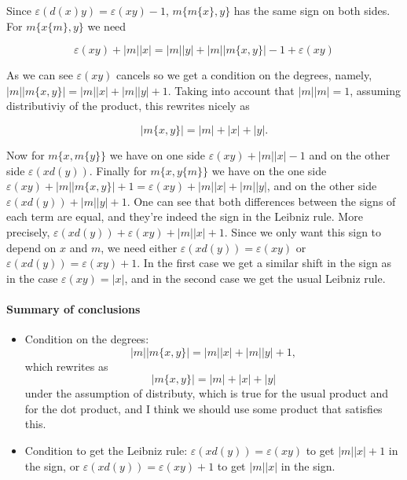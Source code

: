 \documentclass[twoside]{article}
\begin{document}
Since $\varepsilon(d(x)y)=\varepsilon(xy)-1$, $m\{m\{x\},y\}$ has the same sign on both sides. For $m\{x\{m\},y\}$ we need

\[
\varepsilon(xy)+|m||x|=|m||y|+|m||m\{x,y\}|-1+\varepsilon(xy)
\] 

%
%



As we can see $\varepsilon(xy)$ cancels so we get a condition on the degrees, namely, $|m||m\{x,y\}|=|m||x|+|m||y|+1$. Taking into account that $|m||m|=1$, assuming distributiviy of the product, this rewrites nicely as 

$$|m\{x,y\}|=|m|+|x|+|y|.$$

Now for $m\{x,m\{y\}\}$ we have on one side $\varepsilon(xy)+|m||x|-1$ and on the other side $\varepsilon(xd(y))$. Finally for $m\{x,y\{m\}\}$ we have on the one side $\varepsilon(xy)+|m||m\{x,y\}|+1=\varepsilon(xy)+|m||x|+|m||y|$, and on the other side $\varepsilon(xd(y))+|m||y|+1$. One can see that both differences between the signs of each term are equal, and they're indeed the sign in the Leibniz rule. More precisely, $\varepsilon(xd(y))+\varepsilon(xy)+|m||x|+1$. Since we only want this sign to depend on $x$ and $m$, we need either $\varepsilon(xd(y))=\varepsilon(xy)$ or $\varepsilon(xd(y))=\varepsilon(xy)+1$. In the first case we get a similar shift in the sign as in the case $\varepsilon(xy)=|x|$, and in the second case we get the usual Leibniz rule. 



\paragraph{Summary of conclusions}

\begin{itemize}
\item Condition on the degrees: $$|m||m\{x,y\}|=|m||x|+|m||y|+1,$$
which rewrites as 
$$|m\{x,y\}|=|m|+|x|+|y|$$
under the assumption of distributy, which is true for the usual product and for the dot product, and I think we should use some product that satisfies this.

\item Condition to get the Leibniz rule:  $\varepsilon(xd(y))=\varepsilon(xy)$ to get $|m||x|+1$ in the sign, or $\varepsilon(xd(y))=\varepsilon(xy)+1$ to get $|m||x|$ in the sign.

\end{itemize}
\end{document}
